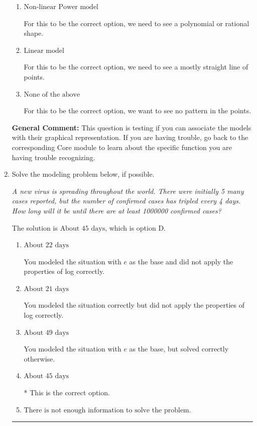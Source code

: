 \documentclass{extbook}[14pt]
\newcommand{\litem}[1]{\item #1

\rule{\textwidth}{0.4pt}}
\begin{document}
\begin{enumerate}
{\begin{enumerate}[label=\Alph*.]
For this to be the correct option, we want a rapid change early, then an extremely slow change later.
\item \( \text{Non-linear Power model} \)

For this to be the correct option, we need to see a polynomial or rational shape.
\item \( \text{Linear model} \)

For this to be the correct option, we need to see a mostly straight line of points.
\item \( \text{None of the above} \)

For this to be the correct option, we want to see no pattern in the points.
\end{enumerate}

\textbf{General Comment:} This question is testing if you can associate the models with their graphical representation. If you are having trouble, go back to the corresponding Core module to learn about the specific function you are having trouble recognizing.
}
\litem{
Solve the modeling problem below, if possible.

\begin{center}
    \textit{ A new virus is spreading throughout the world. There were initially 5 many cases reported, but the number of confirmed cases has tripled every 4 days. How long will it be until there are at least 1000000 confirmed cases? }
\end{center}


The solution is \( \text{About } 45 \text{ days} \), which is option D.\begin{enumerate}[label=\Alph*.]
\item \( \text{About } 22 \text{ days} \)

You modeled the situation with $e$ as the base and did not apply the properties of log correctly.
\item \( \text{About } 21 \text{ days} \)

You modeled the situation correctly but did not apply the properties of log correctly.
\item \( \text{About } 49 \text{ days} \)

You modeled the situation with $e$ as the base, but solved correctly otherwise.
\item \( \text{About } 45 \text{ days} \)

* This is the correct option.
\item \( \text{There is not enough information to solve the problem.} \)


\end{enumerate}}
\end{enumerate}
\end{document}
